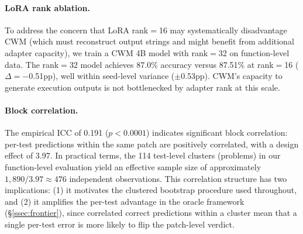 \paragraph{LoRA rank ablation.}
To address the concern that LoRA rank$=$16 may systematically disadvantage CWM (which must reconstruct output strings and might benefit from additional adapter capacity), we train a CWM 4B model with rank$=$32 on function-level data.
The rank$=$32 model achieves 87.0\% accuracy versus 87.51\% at rank$=$16 ($\Delta = -$0.51pp), well within seed-level variance ($\pm$0.53pp).
CWM's capacity to generate execution outputs is not bottlenecked by adapter rank at this scale.

\paragraph{Block correlation.}
The empirical ICC of 0.191 ($p < 0.0001$) indicates significant block correlation: per-test predictions within the same patch are positively correlated, with a design effect of 3.97.
In practical terms, the 114 test-level clusters (problems) in our function-level evaluation yield an effective sample size of approximately $1{,}890 / 3.97 \approx 476$ independent observations.
This correlation structure has two implications: (1) it motivates the clustered bootstrap procedure used throughout, and (2) it amplifies the per-test advantage in the oracle framework (\S\ref{ssec:frontier}), since correlated correct predictions within a cluster mean that a single per-test error is more likely to flip the patch-level verdict.
